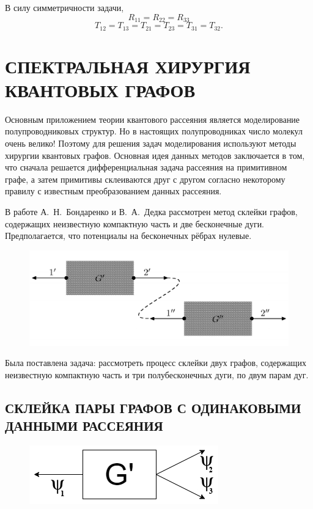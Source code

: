 \documentclass[a4 paper, 12 pt]{extarticle}
\begin{document}
   В силу симметричности задачи,
      \[R_{11} = R_{22} = R_{33}\]
   \[T_{12} = T_{13} = T_{21} = T_{23} = T_{31} = T_{32}.\]
   
   \section{СПЕКТРАЛЬНАЯ ХИРУРГИЯ КВАНТОВЫХ ГРАФОВ}
   Основным приложением теории квантового рассеяния является моделирование полупроводниковых структур. Но в настоящих полупроводниках число молекул очень велико! Поэтому для решения задач моделирования используют методы хирургии квантовых графов. Основная идея данных методов заключается в том, что сначала решается дифференциальная задача рассеяния на примитивном графе, а затем примитивы склеиваются друг с другом согласно некоторому правилу с известным преобразованием данных рассеяния.
   
   В работе А.~Н.~Бондаренко и В.~А.~Дедка \cite{SpectralSurgery} рассмотрен метод склейки графов, содержащих неизвестную компактную часть и две бесконечные дуги. Предполагается, что потенциалы на бесконечных рёбрах нулевые.
   \begin{figure}[!htb]
   	\centering
   	\includegraphics[scale=0.3]{skleika1.png}
   \end{figure}

   Была поставлена задача: рассмотреть процесс склейки двух графов, содержащих неизвестную компактную часть и три полубесконечных дуги, по двум парам дуг.
   
   \subsection{СКЛЕЙКА ПАРЫ ГРАФОВ С ОДИНАКОВЫМИ ДАННЫМИ РАССЕЯНИЯ}
   \begin{figure}[!htb]
   	\centering
   	\includegraphics[scale=0.5]{g_prime.png}
   \end{figure}
\end{document}
